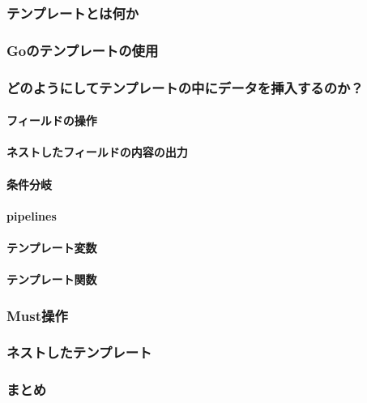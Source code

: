 \subsubsection{テンプレートとは何か}

\subsubsection{Goのテンプレートの使用}

\subsubsection{どのようにしてテンプレートの中にデータを挿入するのか？}

\paragraph{フィールドの操作}

\paragraph{ネストしたフィールドの内容の出力}

\paragraph{条件分岐}

\paragraph{pipelines}

\paragraph{テンプレート変数}

\paragraph{テンプレート関数}

\subsubsection{Must操作}

\subsubsection{ネストしたテンプレート}

\subsubsection{まとめ}

